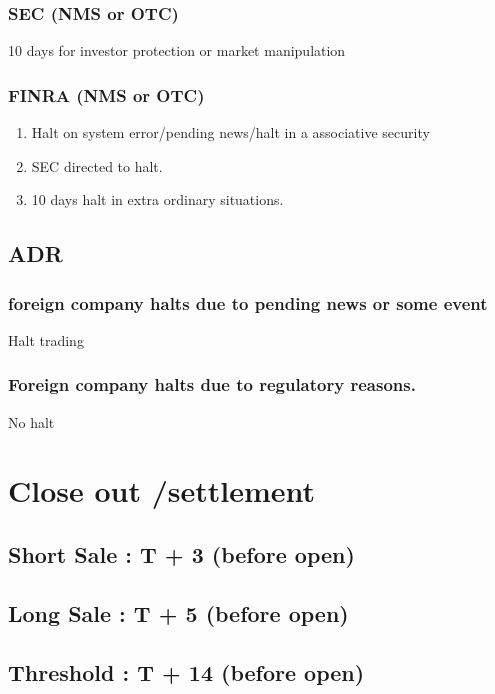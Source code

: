 \documentclass[11pt]{article}
\begin{document}
\subsubsection{SEC (NMS or OTC)}
\label{sec:org800ec94}
10 days for investor protection or market manipulation
\subsubsection{FINRA (NMS or OTC)}
\label{sec:orgde2da35}
\begin{enumerate}
\item Halt on system error/pending news/halt in a associative security
\label{sec:org66ecea8}
\item SEC directed to halt.
\label{sec:orgdb7cfdd}
\item 10 days halt in extra ordinary situations.
\label{sec:org5438c8c}
\end{enumerate}
\subsection{ADR}
\label{sec:org11eb1db}
\subsubsection{foreign company halts due to pending news or some event}
\label{sec:org0ae627e}
Halt trading
\subsubsection{Foreign company halts due to regulatory reasons.}
\label{sec:org936686e}
No halt

\section{Close out /settlement}
\label{sec:orgedc3198}
\subsection{Short Sale : T + 3  (before open)}
\label{sec:org444a461}
\subsection{Long Sale  : T + 5  (before open)}
\label{sec:orgef5db53}
\subsection{Threshold  : T + 14 (before open)}
\label{sec:orgc54a6de}
\end{document}
